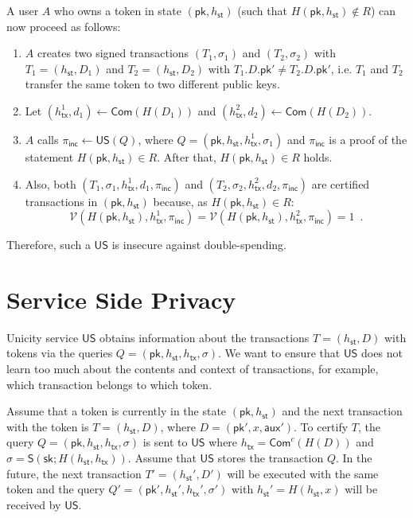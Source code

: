 \documentclass{article}
\newcommand{\sig}[0]{\mathsf{S}}
\newcommand{\pubkey}[0]{\mathsf{pk}}
\newcommand{\prikey}[0]{\mathsf{sk}}
\newcommand{\commit}[0]{\mathsf{Com}}
\newcommand{\commitc}[0]{\mathsf{Com}^{c}}
\newcommand{\unisrv}[0]{\mathsf{US}}
\newcommand{\sthash}[0]{h_\mathsf{st}}
\newcommand{\txhash}[0]{h_\mathsf{tx}}
\newcommand{\auxd}[0]{\mathsf{aux}}
\newcommand{\univer}[0]{\mathcal{V}}
\newcommand{\pinc}[0]{\pi_{\mathsf{inc}}}
\begin{document}
\noindent A user $A$ who owns a token in state $(\pubkey,\sthash)$ (such that $H(\pubkey,\sthash)\not\in R$) can now proceed as follows:
\begin{enumerate}
\item $A$ creates two signed transactions $(T_1,\sigma_1)$ and $(T_2,\sigma_2)$ with
$T_1=(\sthash,D_1)$ and $T_2=(\sthash,D_2)$ with $T_1.D.\pubkey'\neq T_2.D.\pubkey'$, i.e. $T_1$ and $T_2$ transfer the same token to two different public keys.
\item Let $(\txhash^1,d_1)\gets \commit(H(D_1))$ and $(\txhash^2,d_2)\gets \commit(H(D_2))$.
\item $A$ calls $\pinc\gets\unisrv(Q)$, where $Q=(\pubkey,\sthash,\txhash^1,\sigma_1)$ and $\pinc$ is a proof of the statement $H(\pubkey,\sthash)\in R$. After that, $H(\pubkey,\sthash)\in R$ holds.
\item Also, both $(T_1,\sigma_1,\txhash^1,d_1, \pinc)$ and $(T_2,\sigma_2,\txhash^2,d_2, \pinc)$ are certified transactions in $(\pubkey,\sthash)$ because, as $H(\pubkey,\sthash)\in R$:
\[
\univer(H(\pubkey,\sthash),\txhash^1,\pinc)=
\univer(H(\pubkey,\sthash),\txhash^2,\pinc)=1\enspace.
\]
\end{enumerate}

\noindent Therefore, such a $\unisrv$ is insecure against double-spending.

\section{Service Side Privacy}

Unicity service $\unisrv$ obtains information about the transactions $T=(\sthash,D)$ with tokens via the queries $Q=(\pubkey, \sthash, \txhash,\sigma)$. We want to ensure that $\unisrv$ does not learn too much about the contents and context of transactions, for example, which transaction belongs to which token.

Assume that a token is currently in the state $(\pubkey,\sthash)$ and the next transaction with the token is $T=(\sthash, D)$, where $D=(\pubkey',x,\auxd')$. To certify $T$, the query
$Q=(\pubkey,\sthash,\txhash,\sigma)$ is sent to $\unisrv$ where $\txhash=\commitc(H(D))$ and $\sigma = \sig(\prikey; H(\sthash,\txhash))$.
Assume that $\unisrv$ stores the transaction $Q$.
In the future, the next transaction $T'=(\sthash',D')$ will be executed with the same token and the query
$Q'=(\pubkey',\sthash',\txhash',\sigma')$ with $\sthash'=H(\sthash,x)$ will be received by $\unisrv$.
\end{document}
